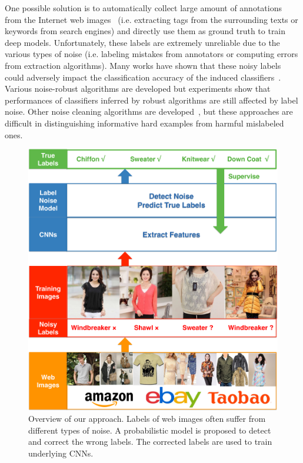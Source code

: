 \documentclass[10pt,twocolumn,letterpaper]{article}
\begin{document}
One possible solution is to automatically collect large amount of annotations from the Internet web images~\cite{gong2014multiview} (i.e. extracting tags from the surrounding texts or keywords from search engines) and directly use them as ground truth to train deep models. Unfortunately, these labels are extremely unreliable due to the various types of noise (i.e. labeling mistakes from annotators or computing errors from extraction algorithms). Many works have shown that these noisy labels could adversely impact the classification accuracy of the induced classifiers~\cite{zhu2004class,nettleton2010study,pechenizkiy2006class}. Various noise-robust algorithms are developed but experiments show that performances of classifiers inferred by robust algorithms are still affected by label noise. Other noise cleaning algorithms are developed~\cite{barandela2000decontamination,brodley2011identifying}, but these approaches are difficult in distinguishing informative hard examples from harmful mislabeled ones. 

\begin{figure}[t]
\begin{center}
\includegraphics[width=0.9\linewidth]{figure/overview.pdf}
\end{center}
\caption{Overview of our approach. Labels of web images often suffer from different types of noise. A probabilistic model is proposed to detect and correct the wrong labels. The corrected labels are used to train underlying CNNs.}
\label{fig:overview}
\end{figure}
\end{document}
